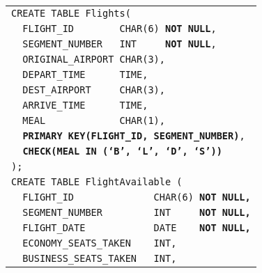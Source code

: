\documentclass[12pt]{article}
\begin{document}
\begin{enumerate}
              \newpage

              \begin{figure}[hp]
                \centering
                \normalsize
                \begin{tabular}{l}
                  \texttt{CREATE TABLE Flights(}                                        \\
                  \texttt{~~FLIGHT\_ID~~~~~~~~CHAR(6)~\textbf{NOT NULL},}               \\
                  \texttt{~~SEGMENT\_NUMBER~~~INT~~~~~\textbf{NOT~NULL},}               \\
                  \texttt{~~ORIGINAL\_AIRPORT~CHAR(3),}                                 \\
                  \texttt{~~DEPART\_TIME~~~~~~TIME,}                                    \\
                  \texttt{~~DEST\_AIRPORT~~~~~CHAR(3),}                                 \\
                  \texttt{~~ARRIVE\_TIME~~~~~~TIME,}                                    \\
                  \texttt{~~MEAL  ~~~~~~~~~~~~CHAR(1),}                                 \\
                  \texttt{~~\textbf{PRIMARY KEY(FLIGHT\_ID, SEGMENT\_NUMBER)},}         \\
                  \texttt{~~\textbf{CHECK(MEAL IN (`B', `L', `D', `S'))}}               \\
                  \texttt{);} \vspace{2mm}                                              \\                                                                    
                  \texttt{CREATE TABLE FlightAvailable (}                               \\
                  \texttt{~~FLIGHT\_ID~~~~~~~~~~~~~~CHAR(6) \textbf{NOT NULL,}}         \\
                  \texttt{~~SEGMENT\_NUMBER~~~~~~~~~INT~~~~~\textbf{NOT NULL,}}         \\
                  \texttt{~~FLIGHT\_DATE~~~~~~~~~~~~DATE~~~~\textbf{NOT NULL,}}         \\
                  \texttt{~~ECONOMY\_SEATS\_TAKEN~~~~INT,}                              \\
                  \texttt{~~BUSINESS\_SEATS\_TAKEN~~~INT,}                              \\

\end{tabular}
\end{figure}
\end{enumerate}
\end{document}
